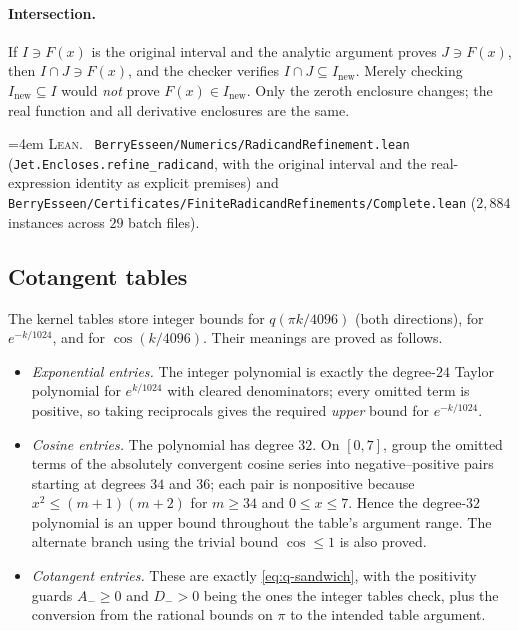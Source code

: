 \documentclass[10pt,a4paper]{article}
\theoremstyle{plain}
\theoremstyle{definition}
\newcommand{\lean}[1]{\texttt{#1}}
\newcommand{\file}[1]{\texttt{#1}}
\newenvironment{leanref}%
  {\par\addvspace{3pt}\begingroup\sloppy\emergencystretch=4em
   \noindent\footnotesize\textsc{Lean.}\ \ignorespaces}%
  {\par\endgroup\addvspace{3pt}}
\begin{document}
\paragraph{Intersection.}
If $I\ni F(x)$ is the original interval and the analytic argument proves
$J\ni F(x)$, then $I\cap J\ni F(x)$, and the checker verifies
$I\cap J\subseteq I_{\mathrm{new}}$. Merely checking
$I_{\mathrm{new}}\subseteq I$ would \emph{not} prove $F(x)\in I_{\mathrm{new}}$.
Only the zeroth enclosure changes; the real function and all derivative
enclosures are the same.

\begin{leanref}
\file{BerryEsseen/Numerics/RadicandRefinement.lean}
(\lean{Jet.Encloses.refine\_radicand}, with the original interval and the
real-expression identity as explicit premises) and
\file{BerryEsseen/Certificates/FiniteRadicandRefinements/Complete.lean}
($2{,}884$ instances across $29$ batch files).
\end{leanref}

\subsection{Cotangent tables}

The kernel tables store integer bounds for $q(\pi k/4096)$ (both directions),
for $e^{-k/1024}$, and for $\cos(k/4096)$. Their meanings are proved as
follows.
\begin{itemize}[leftmargin=2.2em]
\item \emph{Exponential entries.} The integer polynomial is exactly the
  degree-$24$ Taylor polynomial for $e^{k/1024}$ with cleared denominators;
  every omitted term is positive, so taking reciprocals gives the required
  \emph{upper} bound for $e^{-k/1024}$.
\item \emph{Cosine entries.} The polynomial has degree $32$. On $[0,7]$, group
  the omitted terms of the absolutely convergent cosine series into
  negative--positive pairs starting at degrees $34$ and $36$; each pair is
  nonpositive because $x^2\le(m+1)(m+2)$ for $m\ge34$ and $0\le x\le7$. Hence
  the degree-$32$ polynomial is an upper bound throughout the table's argument
  range. The alternate branch using the trivial bound $\cos\le1$ is also proved.
\item \emph{Cotangent entries.} These are exactly
  \eqref{eq:q-sandwich}, with the positivity guards $A_-\ge0$ and $D_->0$ being
  the ones the integer tables check, plus the conversion from the rational
  bounds on $\pi$ to the intended table argument.
\end{itemize}
\end{document}
